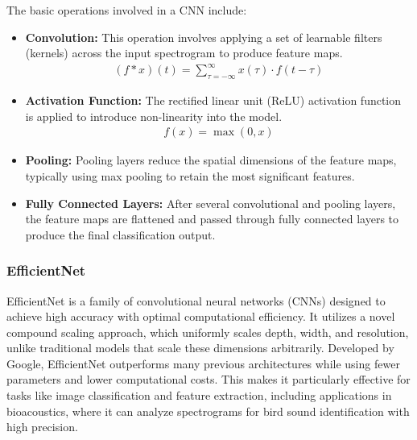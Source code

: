 The basic operations involved in a CNN include:
\begin{itemize}
    \item \textbf{Convolution:} This operation involves applying a set of
          learnable filters (kernels) across the input spectrogram to produce feature
          maps.
          \begin{eqnarray}
              (f * x)(t) = \sum_{\tau = -\infty}^{\infty} x(\tau) \cdot f(t -
              \tau)
          \end{eqnarray}

    \item \textbf{Activation Function:} The rectified linear unit (ReLU)
          activation function is applied to introduce non-linearity into the model.
          \begin{eqnarray}
              f(x) = \max(0, x)
          \end{eqnarray}

    \item \textbf{Pooling:} Pooling layers reduce the spatial dimensions of the
          feature maps, typically using
          max pooling to retain the most significant features.
    \item \textbf{Fully Connected Layers:} After several convolutional and
          pooling layers, the feature maps
          are flattened and passed through fully connected layers to produce the
          final classification output.
\end{itemize}

\subsubsection{EfficientNet}
EfficientNet is a family of convolutional neural networks (CNNs) designed to
achieve high accuracy with optimal computational efficiency. It utilizes a
novel compound scaling approach, which uniformly scales depth, width, and
resolution, unlike traditional models that scale these dimensions arbitrarily.
Developed by Google, EfficientNet outperforms many previous architectures while
using fewer parameters and lower computational costs. This makes it
particularly effective for tasks like image classification and feature
extraction, including applications in bioacoustics, where it can analyze
spectrograms for bird sound identification with high precision.

